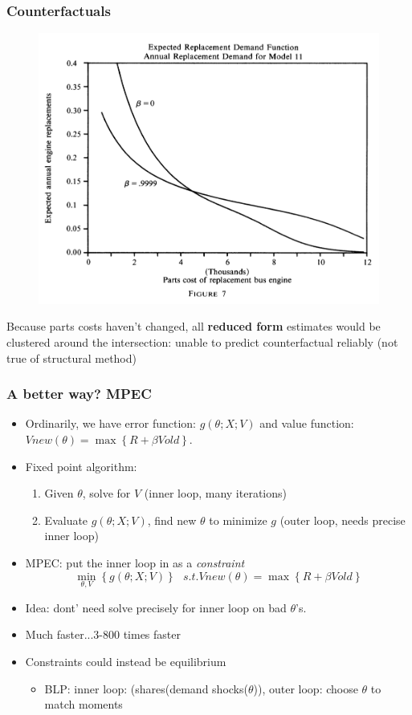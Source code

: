 \documentclass{beamer}
\begin{document}
\begin{frame}
\frametitle{Counterfactuals}
\begin{center}
\begin{figure}[h!]
\includegraphics[scale =0.23]{Figure7.png}
\end{figure}
\end{center}
Because parts costs haven't changed, all \textbf{reduced form} estimates would be clustered around the intersection: unable to predict counterfactual reliably (not true of structural method)
\end{frame}

\begin{frame}
\frametitle{A better way?  MPEC}
\begin{itemize}
\item  Ordinarily, we have error function:  $g(\theta;X;V)$ and value function: $Vnew(\theta)=\max\left\{R+\beta Vold\right\}$.
\bigskip
\item Fixed point algorithm:
\begin{enumerate}
\item Given $\theta$, solve for $V$ (inner loop, many iterations)
\item Evaluate $g(\theta;X;V)$, find new $\theta$ to minimize $g$ (outer loop, needs precise inner loop)
\end{enumerate}
\item MPEC: put the inner loop in as a \emph{constraint}
$$\min_{\theta,V}\left\{g(\theta;X;V)\right\}\ \ \ s.t. Vnew(\theta)=\max\left\{R+\beta Vold\right\}$$
\item Idea: dont' need solve precisely for inner loop on bad $\theta$'s.
\item Much faster...3-800 times faster
\item Constraints could instead be equilibrium 
\begin{itemize}
\item BLP:  inner loop:  (shares(demand shocks($\theta$)), outer loop: choose $\theta$ to match moments
\end{itemize}
\end{itemize}
\end{frame}
\end{document}
